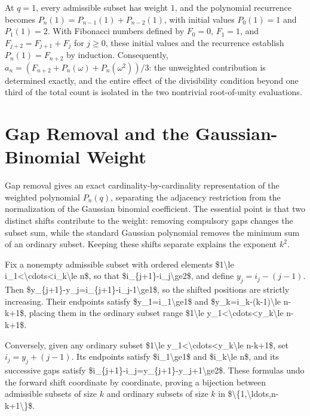 \documentclass[11pt]{article}
\begin{document}
At $q=1$, every admissible subset has weight $1$, and the polynomial recurrence becomes $P_n(1)=P_{n-1}(1)+P_{n-2}(1)$, with initial values $P_0(1)=1$ and $P_1(1)=2$. With Fibonacci numbers defined by $F_0=0$, $F_1=1$, and $F_{j+2}=F_{j+1}+F_j$ for $j\geq 0$, these initial values and the recurrence establish $P_n(1)=F_{n+2}$ by induction. Consequently, $a_n=(F_{n+2}+P_n(\omega)+P_n(\omega^2))/3$: the unweighted contribution is determined exactly, and the entire effect of the divisibility condition beyond one third of the total count is isolated in the two nontrivial root-of-unity evaluations.

\section{Gap Removal and the Gaussian-Binomial Weight}
Gap removal gives an exact cardinality-by-cardinality representation of the weighted polynomial $P_n(q)$, separating the adjacency restriction from the normalization of the Gaussian binomial coefficient. The essential point is that two distinct shifts contribute to the weight: removing compulsory gaps changes the subset sum, while the standard Gaussian polynomial removes the minimum sum of an ordinary subset. Keeping these shifts separate explains the exponent $k^2$.

Fix a nonempty admissible subset with ordered elements \$1\textbackslash{}le i\_1\textless{}\textbackslash{}cdots\textless{}i\_k\textbackslash{}le n\$, so that \$i\_\{j+1\}-i\_j\textbackslash{}ge2\$, and define $y_j=i_j-(j-1)$. Then \$y\_\{j+1\}-y\_j=i\_\{j+1\}-i\_j-1\textbackslash{}ge1\$, so the shifted positions are strictly increasing. Their endpoints satisfy \$y\_1=i\_1\textbackslash{}ge1\$ and \$y\_k=i\_k-(k-1)\textbackslash{}le n-k+1\$, placing them in the ordinary subset range \$1\textbackslash{}le y\_1\textless{}\textbackslash{}cdots\textless{}y\_k\textbackslash{}le n-k+1\$.

Conversely, given any ordinary subset \$1\textbackslash{}le y\_1\textless{}\textbackslash{}cdots\textless{}y\_k\textbackslash{}le n-k+1\$, set $i_j=y_j+(j-1)$. Its endpoints satisfy \$i\_1\textbackslash{}ge1\$ and \$i\_k\textbackslash{}le n\$, and its successive gaps satisfy \$i\_\{j+1\}-i\_j=y\_\{j+1\}-y\_j+1\textbackslash{}ge2\$. These formulas undo the forward shift coordinate by coordinate, proving a bijection between admissible subsets of size $k$ and ordinary subsets of size $k$ in \$\textbackslash{}\{1,\textbackslash{}ldots,n-k+1\textbackslash{}\}\$.
\end{document}
